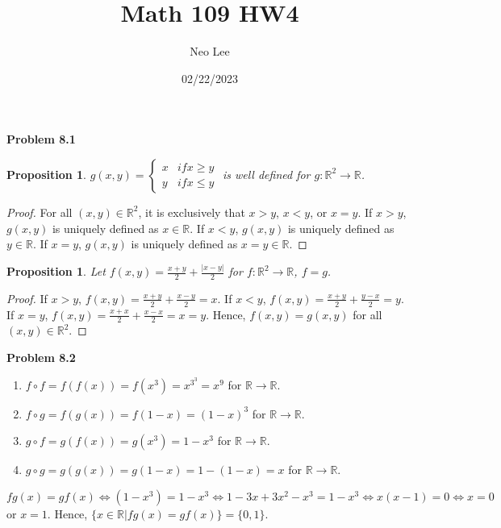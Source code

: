 \documentclass{article}
\title{Math 109 HW4}
\author{Neo Lee}
\date{02/22/2023}
\newtheorem{prop}[thm]{Proposition}
\begin{document}
 

\maketitle 
\textbf{Problem 8.1}
\begin{prop}
    $g(x,y)=\begin{cases}
        x & if x \ge y \\
        y & if x \le y
    \end{cases}$ is well defined for $g:\mathbb{R}^2\rightarrow\mathbb{R}$.
\end{prop}
\begin{proof}
    For all $(x,y) \in \mathbb{R}^2$, it is exclusively that $x>y$, $x<y$, or $x=y$. 
    If $x>y$, $g(x,y)$ is uniquely defined as $x \in \mathbb{R}$.
    If $x<y$, $g(x,y)$ is uniquely defined as $y \in \mathbb{R}$.
    If $x=y$, $g(x,y)$ is uniquely defined as $x=y \in \mathbb{R}$.
\end{proof}
\begin{prop}
    Let $f(x,y)=\frac{x+y}{2}+\frac{|x-y|}{2}$ for $f:\mathbb{R}^2\rightarrow\mathbb{R}$, $f=g$.
\end{prop}
\begin{proof}
    If $x>y$, $f(x,y)=\frac{x+y}{2}+\frac{x-y}{2}=x$.
    If $x<y$, $f(x,y)=\frac{x+y}{2}+\frac{y-x}{2}=y$.
    If $x=y$, $f(x,y)=\frac{x+x}{2}+\frac{x-x}{2}=x=y$.
    Hence, $f(x,y)=g(x,y)$ for all $(x,y)\in \mathbb{R}^2$.
\end{proof}
\bigbreak

\textbf{Problem 8.2}
\begin{enumerate}[label={(\roman*)}]
    \item $f\circ f=f(f(x))=f(x^3)=x^{3^3}=x^9$ for $\mathbb{R}\rightarrow\mathbb{R}$.
    \item $f\circ g=f(g(x))=f(1-x)=(1-x)^3$ for $\mathbb{R}\rightarrow\mathbb{R}$.
    \item $g\circ f=g(f(x))=g(x^3)=1-x^3$ for $\mathbb{R}\rightarrow\mathbb{R}$.
    \item $g\circ g=g(g(x))=g(1-x)=1-(1-x)=x$ for $\mathbb{R}\rightarrow\mathbb{R}$.
\end{enumerate}

$fg(x)=gf(x)\Leftrightarrow(1-x^3)=1-x^3\Leftrightarrow 1-3x+3x^2-x^3=1-x^3\Leftrightarrow x(x-1)=0\Leftrightarrow x=0$ or $x=1$. 
Hence, $\{x\in\mathbb{R}|fg(x)=gf(x)\}=\{0,1\}$.
\bigbreak
\end{document}
